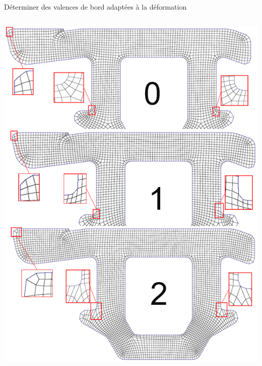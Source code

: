 \begin{frame}{Déterminer des valences de bord adaptées à la déformation}
    \begin{columns}[c] %

        \includegraphics[width=\linewidth]{img/new_images/evolution_verrin.PNG}


\end{columns}
\end{frame}
